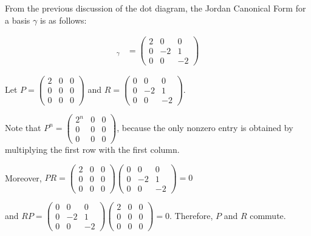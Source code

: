 \documentclass[11pt]{scrartcl}
\begin{document}
\begin{soln}
  \hfill

  From the previous discussion of the dot diagram, the Jordan
  Canonical Form for a basis $\gamma$ is as follows:

  \begin{align}
[A]_{\gamma} &= 
               \begin{pmatrix}
                 2 & 0 & 0\\
                 0 & -2 & 1\\
                 0 & 0 & -2
               \end{pmatrix}
  \end{align}


  Let $P = 
\begin{pmatrix}
2 & 0 & 0\\
0 & 0 & 0\\
0 & 0 & 0
  \end{pmatrix}$ and $R=
  \begin{pmatrix}
0 & 0 & 0\\
0 & -2 & 1\\
0 & 0 & -2
\end{pmatrix}$.

Note that $P^n = 
\begin{pmatrix}
2^n & 0 & 0\\
0 & 0 & 0\\
0 & 0 & 0
\end{pmatrix}
$, because the only nonzero entry is obtained by multiplying the first
row with the first column.

Moreover, $PR = 
\begin{pmatrix}
2 & 0 & 0\\
0 & 0 & 0\\
0 & 0 & 0
  \end{pmatrix}
  \begin{pmatrix}
0 & 0 & 0\\
0 & -2 & 1\\
0 & 0 & -2
\end{pmatrix} = 0
$ 

and $RP = 
  \begin{pmatrix}
0 & 0 & 0\\
0 & -2 & 1\\
0 & 0 & -2
\end{pmatrix}
\begin{pmatrix}
2 & 0 & 0\\
0 & 0 & 0\\
0 & 0 & 0
  \end{pmatrix}
= 0$. Therefore, $P$ and $R$ commute.


\end{soln}
\end{document}
